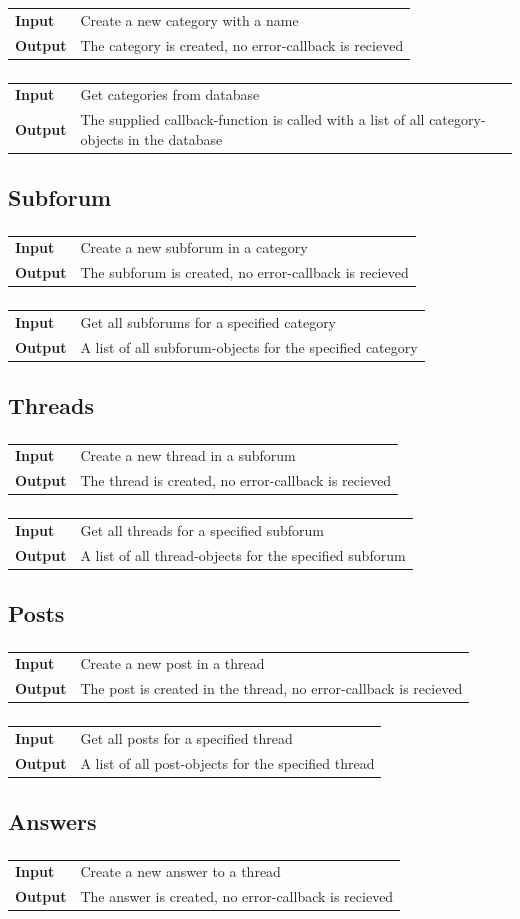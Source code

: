 \documentclass[a4paper, 12pt, titlepage]{article}
\newcommand{\testcase}[2]{
	\subsubsection{}
	\begin{tabular}{l p{11cm}}
	\bf{Input} & 
		#1\\
	\bf{Output} & 
		#2\\
	\end{tabular}
}
\begin{document}
		\testcase
		{
			Create a new category with a name 
		}{
			The category is created, no error-callback is recieved
		}

		\testcase
		{
			Get categories from database
		}{
			The supplied callback-function is called with a list of all category-objects in the database
		}

	\subsection{Subforum}

		\testcase
		{
			Create a new subforum in a category
		}{
			The subforum is created, no error-callback is recieved
		}

		\testcase
		{
			Get all subforums for a specified category
		}{
			A list of all subforum-objects for the specified category
		}

	\subsection{Threads}

		\testcase
		{
			Create a new thread in a subforum
		}{
			The thread is created, no error-callback is recieved
		}

		\testcase
		{
			Get all threads for a specified subforum
		}{
			A list of all thread-objects for the specified subforum
		}

	\subsection{Posts}

		\testcase
		{
			Create a new post in a thread
		}{
			The post is created in the thread, no error-callback is recieved
		}

		\testcase
		{
			Get all posts for a specified thread
		}{
			A list of all post-objects for the specified thread
		}

	\subsection{Answers}

		\testcase
		{
			Create a new answer to a thread
		}{
			The answer is created, no error-callback is recieved
		}
\end{document}
